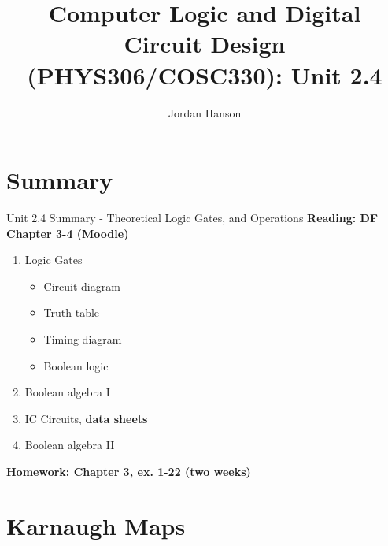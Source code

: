 \documentclass{beamer}
\title{Computer Logic and Digital Circuit Design (PHYS306/COSC330): Unit 2.4}
\author{Jordan Hanson}
\institute{Whittier College Department of Physics and Astronomy}
\begin{document}
\maketitle

\section{Summary}

\begin{frame}{Unit 2.4 Summary - Theoretical Logic Gates, and Operations}
\textbf{Reading: DF Chapter 3-4 (Moodle)}
\begin{enumerate}
\item Logic Gates
\begin{itemize}
\item Circuit diagram
\item Truth table
\item Timing diagram
\item Boolean logic
\end{itemize}
\item \alert{Boolean algebra I}
\item IC Circuits, \textbf{data sheets}
\item \alert{Boolean algebra II}
\end{enumerate}
\textbf{Homework: Chapter 3, ex. 1-22 (two weeks)}
\end{frame}

\section{Karnaugh Maps}
\end{document}
